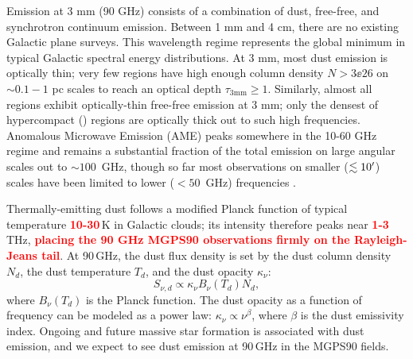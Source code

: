 \documentclass[twocolumn]{aastex62}
\def\todo#1{{\textcolor{red}{TODO: #1}}}
\def\edit#1{{\textcolor{red}{\textbf{#1}}}}
\begin{document}
Emission at 3 mm (90 GHz) consists of a combination of dust, free-free, and synchrotron continuum emission. 
Between 1 mm and 4 cm, there are no existing Galactic plane surveys.  This wavelength
regime represents the global minimum in typical Galactic spectral energy
distributions.  At 3 mm, most dust emission is optically thin; very few regions
have high enough column density $N>3\ee{26}$ \persc on $\sim0.1-1$ pc scales to reach an optical
depth $\tau_{3 \mathrm{mm}}\geq1$.  Similarly, almost all \hii regions exhibit
optically-thin free-free emission  at 3 mm; only the densest of hypercompact
\hii (\hchii) regions are optically thick out to such high frequencies.
Anomalous Microwave Emission (AME) peaks somewhere in the 10-60 GHz
regime and remains a substantial fraction of the total emission on large angular scales out to
$\sim100$~GHz, though so far most observations on smaller ($\lesssim10\mbox{$^\prime$}$) scales have
been limited to lower ($<50$~GHz) frequencies  \citep{Dickinson2018a}.


Thermally-emitting dust follows a modified Planck function of typical temperature
\edit{10-30}\,K in Galactic clouds; its intensity therefore peaks near
\edit{1-3}\,THz, \edit{placing the 90 GHz MGPS90 observations firmly on the
Rayleigh-Jeans tail}.  At
90\,GHz, the dust flux density is set by the dust column density $N_d$, the
dust temperature $T_d$,
and the dust opacity $\kappa_\nu$:
\begin{equation}
    S_{\nu, d} \propto \kappa_\nu B_\nu(T_d) N_d,
    \label{eq:dust}
\end{equation}
where $B_\nu(T_d)$ is the Planck function.  The dust opacity as a function of
frequency can be modeled as a power law: $\kappa_\nu \propto \nu^{\beta}$,
where $\beta$ is the dust emissivity index.
Ongoing and future massive star formation is associated with dust emission, and
we expect to see dust emission at 90\,GHz in the MGPS90 fields.  
\end{document}
